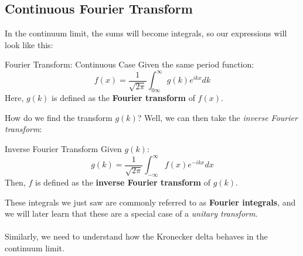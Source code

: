       \subsection{Continuous Fourier Transform}
        In the continuum limit, the sums will become integrals, so our expressions will look like this:
        \begin{definition}{Fourier Transform: Continuous Case}{}
          Given the same period function:
          $$f(x) = \frac{1}{\sqrt{2\pi}}\int_{0\infty}^{\infty}g(k)e^{ikx}dk$$
          Here, $g(k)$ is defined as the \textbf{Fourier transform} of $f(x)$.
        \end{definition}
        How do we find the transform $g(k)$? Well, we can then take the \textit{inverse Fourier transform}:
        \begin{definition}{Inverse Fourier Transform}{}
          Given $g(k)$:
          $$g(k) = \frac{1}{\sqrt{2\pi}}\int_{-\infty}^{\infty}f(x)e^{-ikx}dx$$
          Then, $f$ is defined as the \textbf{inverse Fourier transform} of $g(k)$.
        \end{definition}
        These integrals we just saw are commonly referred to as \textbf{Fourier integrals}, and we will later learn that these are a special case of a \textit{unitary transform}.\\\\
        Similarly, we need to understand how the Kronecker delta behaves in the continuum limit.

